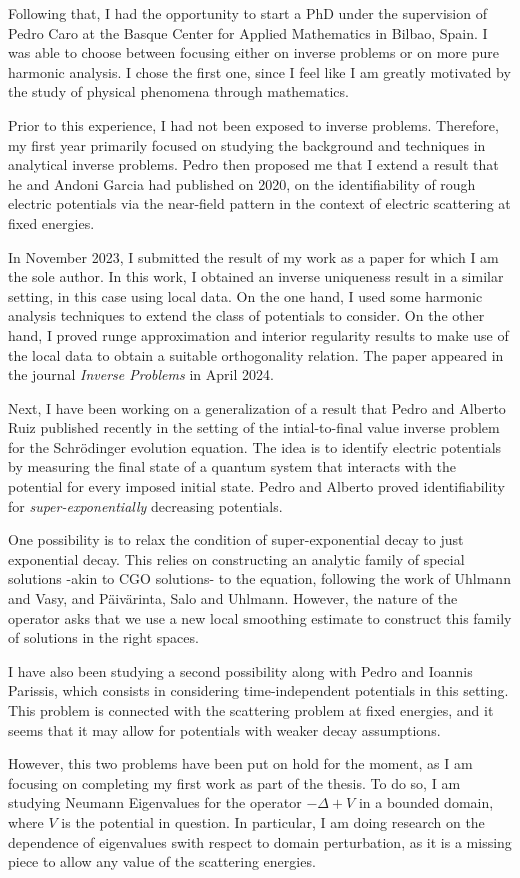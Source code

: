 \documentclass{article}
\begin{document}
Following that, I had the opportunity to start a PhD under the supervision of Pedro Caro at the Basque Center for Applied Mathematics in Bilbao, Spain. I was able to choose between focusing either on inverse problems or on more pure harmonic analysis. I chose the first one, since I feel like I am greatly motivated by the study of physical phenomena through mathematics.

Prior to this experience, I had not been exposed to inverse problems. Therefore, my first year primarily focused on studying the background and techniques in analytical inverse problems. Pedro then proposed me that I extend a result that he and Andoni Garcia had published on 2020, on the identifiability of rough electric potentials via the near-field pattern in the context of electric scattering at fixed energies.

In November 2023, I submitted the result of my work as a paper for which I am the sole author. In this work, I obtained an inverse uniqueness result in a similar setting, in this case using local data. On the one hand, I used some harmonic analysis techniques to extend the class of potentials to consider. On the other hand, I proved runge approximation and interior regularity results to make use of the local data to obtain a suitable orthogonality relation. The paper appeared in the journal \textit{Inverse Problems} in April 2024.

Next, I have been working on a generalization of a result that Pedro and Alberto Ruiz published recently in the setting of the intial-to-final value inverse problem for the Schr\"odinger evolution equation. The idea is to identify electric potentials by measuring the final state of a quantum system that interacts with the potential for every imposed initial state. Pedro and Alberto proved identifiability for \textit{super-exponentially} decreasing potentials.

One possibility is to relax the condition of super-exponential decay to just exponential decay. This relies on constructing an analytic family of special solutions -akin to CGO solutions- to the equation, following the work of Uhlmann and Vasy, and P\"aiv\"arinta, Salo and Uhlmann. However, the nature of the operator asks that we use a new local smoothing estimate to construct this family of solutions in the right spaces.

I have also been studying a second possibility along with Pedro and Ioannis Parissis, which consists in considering time-independent potentials in this setting. This problem is connected with the scattering problem at fixed energies, and it seems that it may allow for potentials with weaker decay assumptions.

However, this two problems have been put on hold for the moment, as I am focusing on completing my first work as part of the thesis. To do so, I am studying Neumann Eigenvalues for the operator $-\Delta+V$ in a bounded domain, where $V$ is the potential in question. In particular, I am doing research on the dependence of eigenvalues swith respect to domain perturbation, as it is a missing piece to allow any value of the scattering energies.
\end{document}
